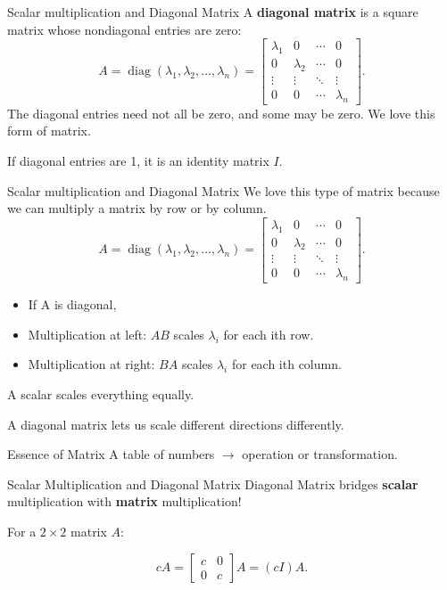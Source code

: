 \begin{frame}{Scalar multiplication and Diagonal Matrix}
A \textbf{diagonal matrix} is a square matrix whose nondiagonal entries are zero:
\[
A=\operatorname{diag}(\lambda_1,\lambda_2,\ldots,\lambda_n)
=\begin{bmatrix}
\lambda_1&0&\cdots&0\\
0&\lambda_2&\cdots&0\\
\vdots&\vdots&\ddots&\vdots\\
0&0&\cdots&\lambda_n
\end{bmatrix}.
\]
\pause
The diagonal entries need not all be zero, and some may be zero. We love this form of matrix. \pause

If diagonal entries are 1, it is an identity matrix $I$.
\end{frame}


\begin{frame}{Scalar multiplication and Diagonal Matrix}
We love this type of matrix because we can multiply a matrix by row or by column.\pause
\[
A=\operatorname{diag}(\lambda_1,\lambda_2,\ldots,\lambda_n)
=\begin{bmatrix}
\lambda_1&0&\cdots&0\\
0&\lambda_2&\cdots&0\\
\vdots&\vdots&\ddots&\vdots\\
0&0&\cdots&\lambda_n
\end{bmatrix}.
\]
\pause

\begin{itemize}
  \item If A is diagonal,\pause
  \item Multiplication at left: $AB$ scales $\lambda_i$ for each ith row.\pause
  \item Multiplication at right: $BA$ scales $\lambda_i$ for each ith column.
\end{itemize}

A scalar scales everything equally.

A diagonal matrix lets us scale different directions differently.
\end{frame}
\begin{frame}{Essence of Matrix}
  A table of numbers $\rightarrow$ operation or transformation.
\end{frame}

\begin{frame}{Scalar Multiplication and Diagonal Matrix}
  Diagonal Matrix bridges \textbf{scalar} multiplication with \textbf{matrix} multiplication!\pause

  For a $2 \times 2$ matrix $A$:

  \[
cA
=\begin{bmatrix}
c&0\\
0&c
\end{bmatrix}A=(cI)A.
\]
  
\end{frame}

